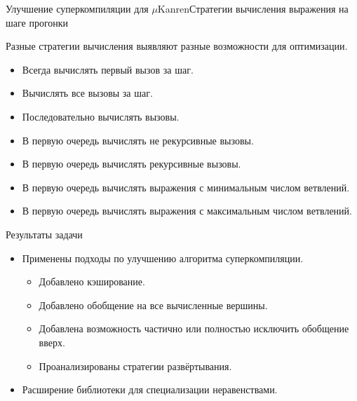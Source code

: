 \documentclass[xcolor=table]{beamer}
\begin{document}
\begin{frame}{Улучшение суперкомпиляции для $\mu$Kanren}{Стратегии вычисления выражения на шаге прогонки}

\begin{block}{}
Разные стратегии вычисления выявляют разные возможности для оптимизации.
\end{block}

\begin{itemize}
\item Всегда вычислять первый вызов за шаг.
\item Вычислять все вызовы за шаг. %
\item Последовательно вычислять вызовы.
\item В первую очередь вычислять не рекурсивные вызовы.
\item В первую очередь вычислять рекурсивные вызовы.
\item В первую очередь вычислять выражения с минимальным числом ветвлений.
\item В первую очередь вычислять выражения с максимальным числом ветвлений.
\end{itemize}

\end{frame}


\begin{frame}{Результаты задачи}
\begin{itemize}
\item Применены подходы по улучшению алгоритма суперкомпиляции.
\begin{itemize}
\item Добавлено кэширование.
\item Добавлено обобщение на все вычисленные вершины.
\item Добавлена возможность частично или полностью исключить обобщение вверх.
\item Проанализированы стратегии развёртывания.
\end{itemize}
\item Расширение библиотеки для специализации неравенствами.
\end{itemize}
\end{frame}
\end{document}
